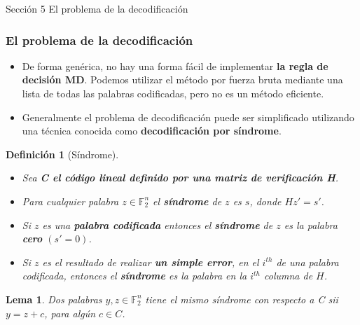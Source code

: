 \documentclass{beamer}
\theoremstyle{plain}
\newtheorem{definicion} [Definicion]{Definición}
\newtheorem{lema} [theorem] {Lema}
\theoremstyle{example}
\theoremstyle{example}
\begin{document}
\begin{frame}   \footnotesize
{
\begin{block}{Sección 5}
El problema de la decodificación
\end{block}
}
\end{frame} 
\begin{frame}  \frametitle{El problema de la decodificación}\footnotesize
\begin{itemize} 

\item  De forma genérica, no hay una forma fácil de implementar \textbf{la regla de decisión MD}. Podemos utilizar el método por fuerza bruta mediante una lista de todas las palabras codificadas, pero no es un método eficiente.

\item Generalmente el problema de decodificación puede ser simplificado utilizando una técnica conocida como \textbf{decodificación por síndrome}.

\end{itemize} 

\begin{definicion}[Síndrome]\footnotesize

\begin{itemize}
\item Sea \textbf{C el código lineal definido por una matriz de verificación H}. 

\item Para cualquier palabra $z \in \mathbb{F}_2^n$ el \textbf{síndrome} de $z$ es $s$, donde $Hz'=s'$.

\item Si $z$ es una \textbf{palabra codificada} entonces el \textbf{síndrome} de $z$ es la palabra \textbf{cero} $(s'=0)$. 

\item Si $z$ es el resultado de realizar \textbf{un simple error}, en el $i^{th}$ de una palabra codificada, entonces el \textbf{síndrome} es la palabra en la $i^{th}$ columna de $H$.

\end{itemize}

\end{definicion}

\begin{lema}
Dos palabras $y, z \in \mathbb{F}_2^n$ tiene el mismo síndrome con respecto a C sii $y= z+c$, para algún $c\in C$.
\end{lema}



\end{frame} 
\end{document}
